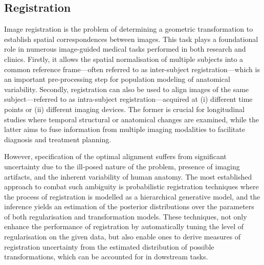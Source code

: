 \subsection{Registration}
Image registration is the problem of determining a geometric transformation to establish spatial correspondences between images. This task plays a foundational role in numerous image-guided medical tasks \cite{maintz1998survey,glocker2011deformable,sotiras2013deformable} performed in both research and clinics. Firstly, it allows the spatial normalisation of multiple subjects into a common reference frame---often referred to as inter-subject registration---which is an important pre-processing step for population modeling of anatomical variability. Secondly, registration can also be used to align images of the same subject---referred to as intra-subject registration---acquired at (i) different time points or (ii) different imaging devices. The former is crucial for longitudinal studies where temporal structural or anatomical changes are examined, while the latter aims to fuse information from multiple imaging modalities to facilitate diagnosis and treatment planning. 

However, specification of the optimal alignment suffers from significant uncertainty due to the ill-posed nature of the problem, presence of imaging artifacts, and the inherent variability of human anatomy. The most established approach to combat such ambiguity is probabilistic registration techniques \cite{van2008encoding,risholm2010summarizing,cobzas2011random,lotfi2013improving,simpson2012probabilistic,risholm2013bayesian,popuri2013variational,zhang2013bayesian,wassermann2014probabilistic,simpson2015probabilistic,heinrich2016deformable,le2016quantifying} where the process of registration is modelled as a hierarchical generative model, and the inference yields an estimation of the posterior distributions over the parameters of both regularisation and transformation models. These techniques, not only enhance the performance of registration by automatically tuning the level of regularisation on the given data, but also enable ones to derive measures of registration uncertainty from the estimated distribution of possible transformations, which can be accounted for in dowstream tasks.

